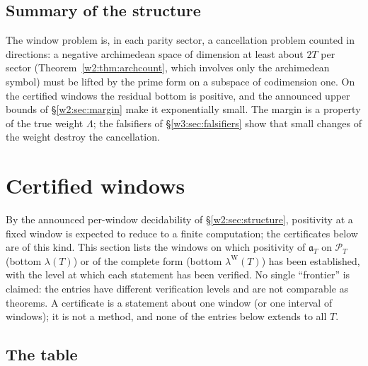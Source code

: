 \documentclass[11pt]{amsart}
\theoremstyle{definition}
\theoremstyle{remark}
\numberwithin{equation}{section}
\newcommand{\PT}{\mathcal{P}_T}                        %
\newcommand{\aT}{\mathfrak{a}_T}                       %
\newcommand{\lam}{\lambda(T)}                          %
\newcommand{\lamW}{\lambda^{\mathrm W}(T)}             %
\begin{document}
\subsection{Summary of the structure}
The window problem is, in each parity sector, a cancellation problem counted in directions: a negative archimedean space
of dimension at least about $2T$ per sector (Theorem~\ref{w2:thm:archcount}, which involves only the archimedean
symbol) must be lifted by the prime form on a subspace of codimension one. On the certified windows the residual bottom
is positive, and the announced upper bounds of \S\ref{w2:sec:margin} make it exponentially small. The margin is a
property of the true weight $\Lambda$; the falsifiers of
\S\ref{w3:sec:falsifiers} show that small changes of the weight destroy the cancellation.


\section{Certified windows}\label{w2:sec:certified}

By the announced per-window decidability of \S\ref{w2:sec:structure}, positivity at a fixed window is expected
to reduce to a finite computation; the certificates below are of this kind. This section lists the windows on which positivity of $\aT$ on $\PT$ (bottom $\lam$) or of the complete
form (bottom $\lamW$) has been established, with the level at which each statement has been verified. No single
``frontier'' is claimed: the entries have different verification levels and are not comparable as theorems. A
certificate is a statement about one window (or one interval of windows); it is not a method, and none of the entries
below extends to all $T$.

\subsection{The table}
\end{document}
